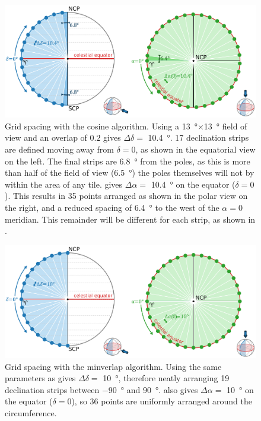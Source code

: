 \begin{colsection}
\begin{colsection}
\begin{figure}[p]
    \begin{center}
        \includegraphics[width=\linewidth]{images/spacing_cosine.pdf}
    \end{center}
    \caption[Grid spacing with the cosine algorithm]{
        Grid spacing with the cosine algorithm. Using a \SI{13}{\degree}$\times$\SI{13}{\degree} field of view and an overlap of $0.2$  gives $\Delta\delta = $ \SI{10.4}{\degree}. 17 declination strips are defined moving away from $\delta=0$, as shown in the equatorial view on the left. The final strips are \SI{6.8}{\degree} from the poles, as this is more than half of the field of view (\SI{6.5}{\degree}) the poles themselves will not by within the area of any tile.  gives $\Delta\alpha = $ \SI{10.4}{\degree} on the equator ($\delta=0$). This results in 35 points arranged as shown in the polar view on the right, and a reduced spacing of \SI{6.4}{\degree} to the west of the $\alpha=0$ meridian. This remainder will be different for each strip, as shown in .
    }\label{fig:cosine_spacing}
\end{figure}

\begin{figure}[p]
    \begin{center}
        \includegraphics[width=\linewidth]{images/spacing_minverlap.pdf}
    \end{center}
    \caption[Grid spacing with the minverlap algorithm]{
        Grid spacing with the minverlap algorithm. Using the same parameters as   gives $\Delta\delta = $ \SI{10}{\degree}, therefore neatly arranging 19 declination strips between \SI{-90}{\degree} and \SI{90}{\degree}.  also gives $\Delta\alpha = $ \SI{10}{\degree} on the equator ($\delta=0$), so 36 points are uniformly arranged around the circumference.
    }\label{fig:minverlap_spacing}
\end{figure}


\end{colsection}
\end{colsection}
